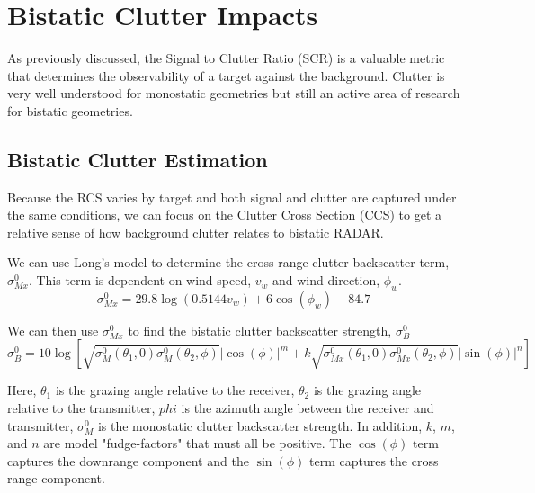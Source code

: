 \chapter{Bistatic Clutter Impacts}

As previously discussed, the Signal to Clutter Ratio (SCR) is a valuable metric that determines the observability of a target against the background. Clutter is very well understood for monostatic geometries but still an active area of research for bistatic geometries.

\section {Bistatic Clutter Estimation}
Because the RCS varies by target and both signal and clutter are captured under the same conditions, we can focus on the Clutter Cross Section (CCS) to get a relative sense of how background clutter relates to bistatic RADAR.

We can use Long's model to determine the cross range clutter backscatter term, $\sigma_{Mx}^0$. This term is dependent on wind speed, $v_w$ and wind direction, $\phi_w$.
\begin{equation}
\sigma_{Mx}^0 = 29.8\log\left(0.5144 v_w\right) + 6\cos\left(\phi_w \right) -84.7
\label{bc_eq:1}
\end{equation}
\renewcommand{\baselinestretch}{2} \small\normalsize

We can then use $\sigma_{Mx}^0$ to find the bistatic clutter backscatter strength, $\sigma_{B}^0$
\begin{equation}
\sigma_B^0 = 10\log\left[\sqrt{\sigma_M^0(\theta_1,0)\sigma_M^0(\theta_2,\phi)} |\cos(\phi)|^m  + k\sqrt{\sigma_{Mx}^0(\theta_1,0)\sigma_{Mx}^0(\theta_2,\phi)}|\sin(\phi)|^n \right]
\label{bc_eq:1}
\end{equation}
\renewcommand{\baselinestretch}{2} \small\normalsize

Here, $\theta_1$ is the grazing angle relative to the receiver, $\theta_2$ is the grazing angle relative to the transmitter, $phi$ is the azimuth angle between the receiver and transmitter, $\sigma_M^0$ is the monostatic clutter backscatter strength. In addition, $k$, $m$, and $n$ are model "fudge-factors" that must all be positive. The $\cos(\phi)$ term captures the downrange component and the $\sin(\phi)$ term captures the cross range component.

